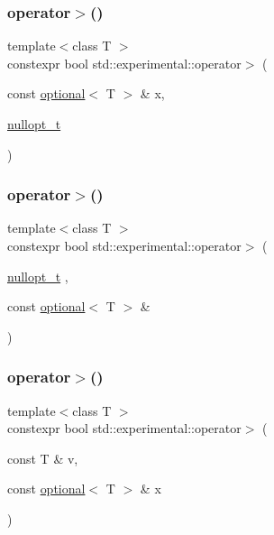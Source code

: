 \subsubsection{\texorpdfstring{operator$>$()}{operator>()}\hspace{0.1cm}{\footnotesize\ttfamily [2/9]}}
{\footnotesize\ttfamily template$<$class T $>$ \\
constexpr bool std\+::experimental\+::operator$>$ (\begin{DoxyParamCaption}\item[{const \mbox{\hyperlink{classstd_1_1experimental_1_1optional}{optional}}$<$ T $>$ \&}]{x,  }\item[{\mbox{\hyperlink{structstd_1_1experimental_1_1nullopt__t}{nullopt\+\_\+t}}}]{ }\end{DoxyParamCaption})\hspace{0.3cm}{\ttfamily [noexcept]}}

\mbox{\label{namespacestd_1_1experimental_a02002e302d09fd9596aadd26a38043c0}} 
\subsubsection{\texorpdfstring{operator$>$()}{operator>()}\hspace{0.1cm}{\footnotesize\ttfamily [3/9]}}
{\footnotesize\ttfamily template$<$class T $>$ \\
constexpr bool std\+::experimental\+::operator$>$ (\begin{DoxyParamCaption}\item[{\mbox{\hyperlink{structstd_1_1experimental_1_1nullopt__t}{nullopt\+\_\+t}}}]{,  }\item[{const \mbox{\hyperlink{classstd_1_1experimental_1_1optional}{optional}}$<$ T $>$ \&}]{ }\end{DoxyParamCaption})\hspace{0.3cm}{\ttfamily [noexcept]}}

\mbox{\label{namespacestd_1_1experimental_a2c15354bc231381036462b92afd3737e}} 
\subsubsection{\texorpdfstring{operator$>$()}{operator>()}\hspace{0.1cm}{\footnotesize\ttfamily [4/9]}}
{\footnotesize\ttfamily template$<$class T $>$ \\
constexpr bool std\+::experimental\+::operator$>$ (\begin{DoxyParamCaption}\item[{const T \&}]{v,  }\item[{const \mbox{\hyperlink{classstd_1_1experimental_1_1optional}{optional}}$<$ T $>$ \&}]{x }\end{DoxyParamCaption})}

